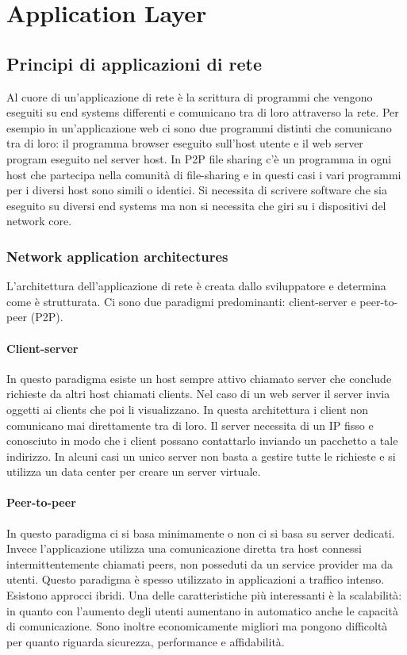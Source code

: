 \chapter{Application Layer}
\section{Principi di applicazioni di rete}
Al cuore di un'applicazione di rete \`e la scrittura di programmi che vengono eseguiti su end systems differenti e comunicano tra di loro attraverso la rete. Per esempio in un'applicazione web ci sono due 
programmi distinti che comunicano tra di loro: il programma browser eseguito sull'host utente e il web server program eseguito nel server host. In P2P file sharing c'\`e un programma in ogni host che partecipa
nella comunit\`a di file-sharing e in questi casi i vari programmi per i diversi host sono simili o identici. Si necessita di scrivere software che sia eseguito su diversi end systems ma non si necessita che giri 
su i dispositivi del network core. 
\subsection{Network application architectures}
L'architettura dell'applicazione di rete \`e creata dallo sviluppatore e determina come \`e strutturata. Ci sono due paradigmi predominanti: client-server e peer-to-peer (P2P).
\subsubsection{Client-server}
In questo paradigma esiste un host sempre attivo chiamato server che conclude richieste da altri host chiamati clients. Nel caso di un web server il server invia oggetti ai clients che poi li visualizzano. In questa
architettura i client non comunicano mai direttamente tra di loro. Il server necessita di un IP fisso e conosciuto in modo che i client possano contattarlo inviando un pacchetto a tale indirizzo. In alcuni casi un 
unico server non basta a gestire tutte le richieste e si utilizza un data center per creare un server virtuale. 
\subsubsection{Peer-to-peer}
In questo paradigma ci si basa minimamente o non ci si basa su server dedicati. Invece l'applicazione utilizza una comunicazione diretta tra host connessi intermittentemente chiamati peers, non posseduti 
da un service provider ma da utenti. Questo paradigma \`e spesso utilizzato in applicazioni a traffico intenso. Esistono approcci ibridi. Una delle caratteristiche pi\`u interessanti \`e la scalabilit\`a: in quanto con 
l'aumento degli utenti aumentano in automatico anche le capacit\`a di comunicazione. Sono inoltre economicamente migliori ma pongono difficolt\`a per quanto riguarda sicurezza, performance e affidabilit\`a.
